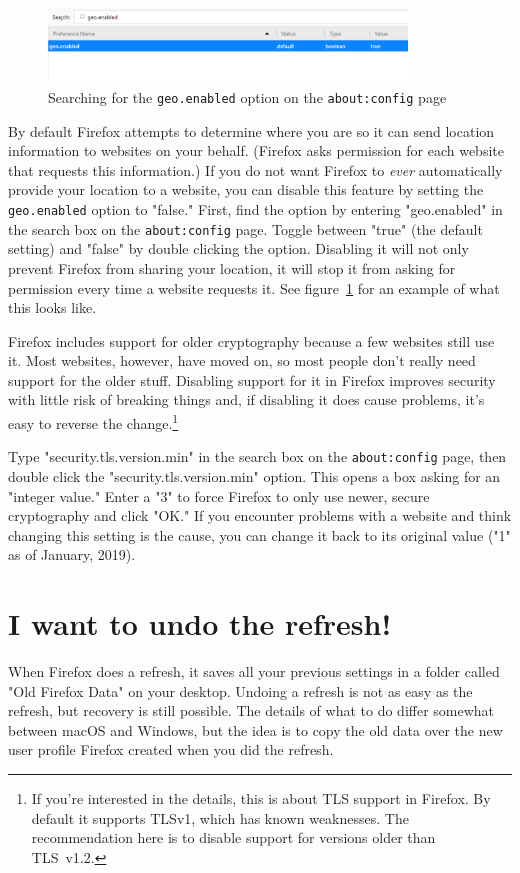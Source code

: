 \documentclass{tufte-handout}
\begin{document}
\begin{figure}
	\includegraphics[width=0.85\textwidth]{images/about-config.png}
	\caption{Searching for the \texttt{geo.enabled} option on the \texttt{about:config} page}
	\label{fig:about-config}
\end{figure}

By default Firefox attempts to determine where you are so it can send location information to websites on your behalf.  (Firefox asks permission for each website that requests this information.)  If you do not want Firefox to \emph{ever} automatically provide your location to a website, you can disable this feature by setting the \texttt{geo.enabled} option to "false."  First, find the option by entering "geo.enabled" in the search box on the \texttt{about:config} page.  Toggle between "true" (the default setting) and "false" by double clicking the option.  Disabling it will not only prevent Firefox from sharing your location, it will stop it from asking for permission every time a website requests it.  See figure~\ref{fig:about-config} for an example of what this looks like.



Firefox includes support for older cryptography because a few websites still use it.  Most websites, however, have moved on, so most people don't really need support for the older stuff.  Disabling support for it in Firefox improves security with little risk of breaking things and, if disabling it does cause problems, it's easy to reverse the change.\footnote{If you're interested in the details, this is about TLS support in Firefox.  By default it supports TLSv1, which has known weaknesses.  The recommendation here is to disable support for versions older than TLS~v1.2.}

Type "security.tls.version.min" in the search box on the \texttt{about:config} page, then double click the "security.tls.version.min" option.  This opens a box asking for an "integer value."  Enter a "3" to force Firefox to only use newer, secure cryptography and click "OK."  If you encounter problems with a website and think changing this setting is the cause, you can change it back to its original value ("1" as of January, 2019).


\section{I want to undo the refresh!}\label{section:undo-the-refresh}
When Firefox does a refresh, it saves all your previous settings in a folder called "Old Firefox Data" on your desktop.  Undoing a refresh is not as easy as the refresh, but recovery is still possible.  The details of what to do differ somewhat between macOS and Windows, but the idea is to copy the old data over the new user profile Firefox created when you did the refresh.
\end{document}
